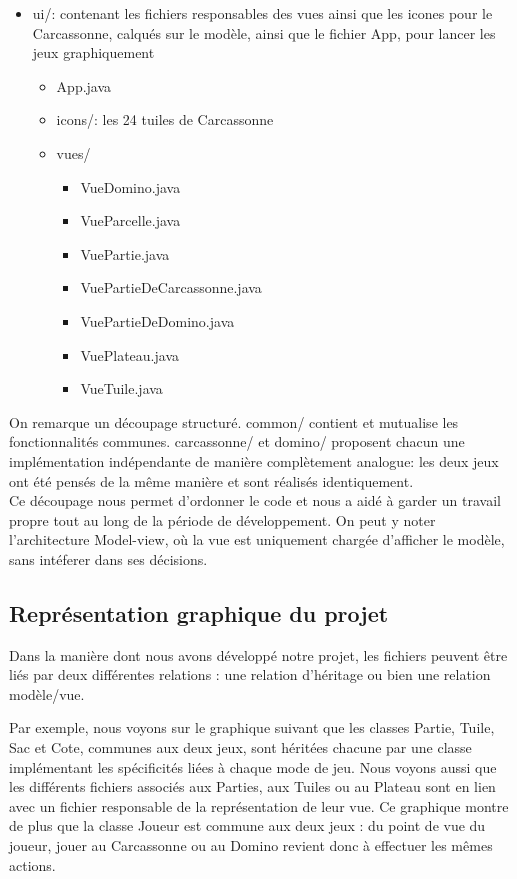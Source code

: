\documentclass{article}
\begin{document}
\begin{itemize}
    \item ui/: contenant les fichiers responsables des vues ainsi que les icones pour le Carcassonne, calqués sur le modèle, ainsi que le fichier App, pour lancer les jeux graphiquement
    \begin{itemize}
        \item App.java
        \item icons/: les 24 tuiles de Carcassonne
        \item vues/
        \begin{itemize}        
        \item VueDomino.java
        \item VueParcelle.java
        \item VuePartie.java
        \item VuePartieDeCarcassonne.java
        \item VuePartieDeDomino.java
        \item VuePlateau.java
        \item VueTuile.java
    \end{itemize}
    \end{itemize}
\end{itemize}

On remarque un découpage structuré. common/ contient et mutualise les fonctionnalités communes. carcassonne/ et domino/ proposent chacun une implémentation indépendante de manière complètement analogue: les deux jeux ont été pensés de la même manière et sont réalisés identiquement.\\
Ce découpage nous permet d'ordonner le code et nous a aidé à garder un travail propre tout au long de la période de développement. On peut y noter l'architecture Model-view, où la vue est uniquement chargée d'afficher le modèle, sans intéferer dans ses décisions.

\subsection{Représentation graphique du projet}
Dans la manière dont nous avons développé notre projet, les fichiers peuvent être liés par deux différentes relations : une relation d'héritage ou bien une relation modèle/vue. 

Par exemple, nous voyons sur le graphique suivant que les classes Partie, Tuile, Sac et Cote, communes aux deux jeux, sont héritées chacune par une classe implémentant les spécificités liées à chaque mode de jeu. Nous voyons aussi que les différents fichiers associés aux Parties, aux Tuiles ou au Plateau sont en lien avec un fichier responsable de la représentation de leur vue. Ce graphique montre de plus que la classe Joueur est commune aux deux jeux : du point de vue du joueur, jouer au Carcassonne ou au Domino revient donc à effectuer les mêmes actions.
\end{document}
